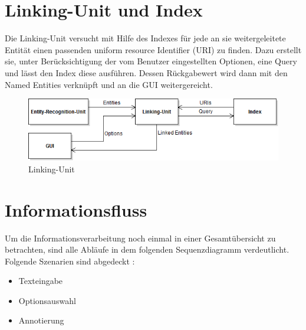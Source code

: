 \documentclass[11pt, a4paper, oneside]{Thesis} %
\begin{document}
\section{Linking-Unit und Index}
Die Linking-Unit versucht mit Hilfe des Indexes f\"ur jede an sie weitergeleitete Entit\"at einen passenden uniform resource Identifier (URI) zu finden. Dazu erstellt sie, unter Ber\"ucksichtigung der vom Benutzer eingestellten Optionen, eine Query und l\"asst den Index diese ausf\"uhren. Dessen R\"uckgabewert wird dann mit den Named Entities verkn\"upft und an die GUI weitergereicht.
\begin{figure}[ht!]
\centering
\includegraphics[scale=0.55]{./linking.png}
\caption[Linking Unit]{Linking-Unit}
\end{figure}
\section{Informationsfluss}
Um die Informationsverarbeitung noch einmal in einer Gesamt\"ubersicht zu betrachten, sind alle Abl\"aufe in dem folgenden Sequenzdiagramm verdeutlicht.
Folgende Szenarien sind abgedeckt :
\begin{itemize}
\item Texteingabe
\item Optionsauswahl
\item Annotierung
\end{itemize}
\end{document}
